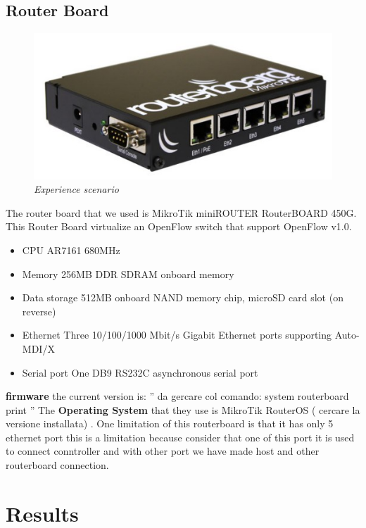 \documentclass[conference,10pt]{IEEEtran}
\begin{document}
\subsection{Router Board}
\begin{figure}[!h]
  \centering
  \includegraphics[scale=0.30]{images/rboard.png}
  \caption{\emph{Experience scenario}}
  \label{fig:topo}
\end{figure}

The router board that we used is MikroTik miniROUTER RouterBOARD 450G. This Router Board virtualize an OpenFlow switch that support
OpenFlow v1.0\cite{routerboard_doc}.
\begin{itemize}
   \item CPU		AR7161 680MHz
   \item Memory		256MB DDR SDRAM onboard memory
   \item Data storage	512MB onboard NAND memory chip, microSD card slot (on reverse)
   \item Ethernet 	Three 10/100/1000 Mbit/s Gigabit Ethernet ports supporting Auto-MDI/X
   \item Serial port 	One DB9 RS232C asynchronous serial port
\end{itemize}
\textbf{firmware} the current version is: '' da gercare col comando: system routerboard print ''
\newline
The \textbf{Operating System} that they use is MikroTik RouterOS ( cercare la versione installata) \cite{routeboard_software}.
\newline
One limitation of this routerboard is that it has only 5 ethernet port this is a limitation because consider that one of this port it is
used to connect conntroller and with other port we have made host and other routerboard connection.


\section{Results}\label{sec:results}
\end{document}
